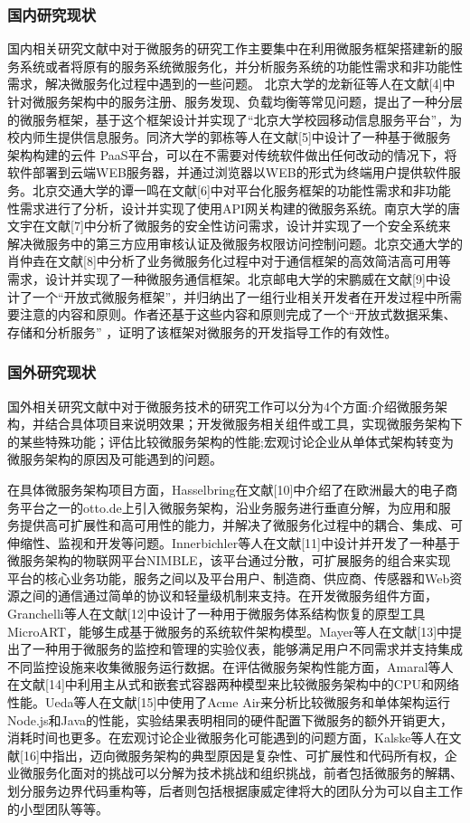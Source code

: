 \subsubsection{国内研究现状}
国内相关研究文献中对于微服务的研究工作主要集中在利用微服务框架搭建新的服务系统或者将原有的服务系统微服务化，并分析服务系统的功能性需求和非功能性需求，解决微服务化过程中遇到的一些问题。
北京大学的龙新征等人在文献[4]中针对微服务架构中的服务注册、服务发现、负载均衡等常见问题，提出了一种分层的微服务框架，基于这个框架设计并实现了“北京大学校园移动信息服务平台”，为校内师生提供信息服务。同济大学的郭栋等人在文献[5]中设计了一种基于微服务架构构建的云件 PaaS平台，可以在不需要对传统软件做出任何改动的情况下，将软件部署到云端WEB服务器，并通过浏览器以WEB的形式为终端用户提供软件服务。北京交通大学的谭一鸣在文献[6]中对平台化服务框架的功能性需求和非功能性需求进行了分析，设计并实现了使用API网关构建的微服务系统。南京大学的唐文宇在文献[7]中分析了微服务的安全性访问需求，设计并实现了一个安全系统来解决微服务中的第三方应用审核认证及微服务权限访问控制问题。北京交通大学的肖仲垚在文献[8]中分析了业务微服务化过程中对于通信框架的高效简洁高可用等需求，设计并实现了一种微服务通信框架。北京邮电大学的宋鹏威在文献[9]中设计了一个“开放式微服务框架”，并归纳出了一组行业相关开发者在开发过程中所需要注意的内容和原则。作者还基于这些内容和原则完成了一个“开放式数据采集、存储和分析服务” ，证明了该框架对微服务的开发指导工作的有效性。

\subsubsection{国外研究现状}
国外相关研究文献中对于微服务技术的研究工作可以分为4个方面:介绍微服务架构，并结合具体项目来说明效果；开发微服务相关组件或工具，实现微服务架构下的某些特殊功能；评估比较微服务架构的性能;宏观讨论企业从单体式架构转变为微服务架构的原因及可能遇到的问题。

在具体微服务架构项目方面，Hasselbring在文献[10]中介绍了在欧洲最大的电子商务平台之一的otto.de上引入微服务架构，沿业务服务进行垂直分解，为应用和服务提供高可扩展性和高可用性的能力，并解决了微服务化过程中的耦合、集成、可伸缩性、监视和开发等问题。Innerbichler等人在文献[11]中设计并开发了一种基于微服务架构的物联网平台NIMBLE，该平台通过分散，可扩展服务的组合来实现平台的核心业务功能，服务之间以及平台用户、制造商、供应商、传感器和Web资源之间的通信通过简单的协议和轻量级机制来支持。在开发微服务组件方面，Granchelli等人在文献[12]中设计了一种用于微服务体系结构恢复的原型工具MicroART，能够生成基于微服务的系统软件架构模型。Mayer等人在文献[13]中提出了一种用于微服务的监控和管理的实验仪表，能够满足用户不同需求并支持集成不同监控设施来收集微服务运行数据。在评估微服务架构性能方面，Amaral等人在文献[14]中利用主从式和嵌套式容器两种模型来比较微服务架构中的CPU和网络性能。Ueda等人在文献[15]中使用了Acme Air来分析比较微服务和单体架构运行Node.js和Java的性能，实验结果表明相同的硬件配置下微服务的额外开销更大，消耗时间也更多。在宏观讨论企业微服务化可能遇到的问题方面，Kalske等人在文献[16]中指出，迈向微服务架构的典型原因是复杂性、可扩展性和代码所有权，企业微服务化面对的挑战可以分解为技术挑战和组织挑战，前者包括微服务的解耦、划分服务边界代码重构等，后者则包括根据康威定律将大的团队分为可以自主工作的小型团队等等。

